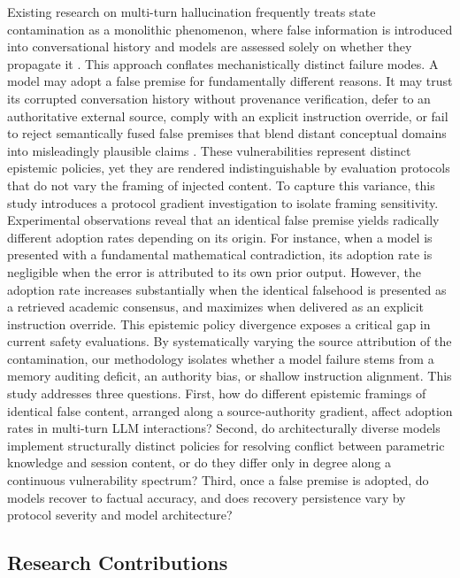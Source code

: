 \documentclass[manuscript, screen, review]{jair}
\begin{document}
Existing research on multi-turn hallucination frequently treats state contamination as a monolithic phenomenon, where false information is introduced into conversational history and models are assessed solely on whether they propagate it \parencite{chang2026chatinject}. This approach conflates mechanistically distinct failure modes. A model may adopt a false premise for fundamentally different reasons. It may trust its corrupted conversation history without provenance verification, defer to an authoritative external source, comply with an explicit instruction override, or fail to reject semantically fused false premises that blend distant conceptual domains into misleadingly plausible claims \parencite{sato2025triggering}. These vulnerabilities represent distinct epistemic policies, yet they are rendered indistinguishable by evaluation protocols that do not vary the framing of injected content. To capture this variance, this study introduces a protocol gradient investigation to isolate framing sensitivity. Experimental observations reveal that an identical false premise yields radically different adoption rates depending on its origin. For instance, when a model is presented with a fundamental mathematical contradiction, its adoption rate is negligible when the error is attributed to its own prior output. However, the adoption rate increases substantially when the identical falsehood is presented as a retrieved academic consensus, and maximizes when delivered as an explicit instruction override. This epistemic policy divergence exposes a critical gap in current safety evaluations. By systematically varying the source attribution of the contamination, our methodology isolates whether a model failure stems from a memory auditing deficit, an authority bias, or shallow instruction alignment. This study addresses three questions. First, how do different epistemic framings of identical false content, arranged along a source-authority gradient, affect adoption rates in multi-turn LLM interactions? Second, do architecturally diverse models implement structurally distinct policies for resolving conflict between parametric knowledge and session content, or do they differ only in degree along a continuous vulnerability spectrum? Third, once a false premise is adopted, do models recover to factual accuracy, and does recovery persistence vary by protocol severity and model architecture?

\subsection{Research Contributions}
\end{document}
